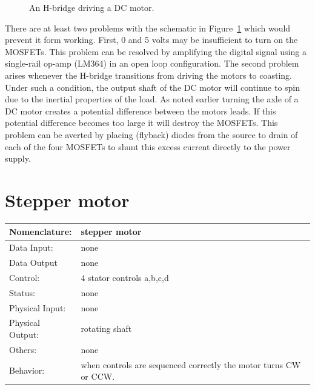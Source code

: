 \begin{figure}[ht]
\caption{An H-bridge driving a DC motor.}
\label{fig:hbridge}
\end{figure}

There are at least two problems with the schematic in
Figure~\ref{fig:hbridge} which would prevent it form working.
First, 0 and 5 volts may be insufficient to turn on the MOSFETs.
This problem can be resolved by amplifying the digital signal
using a single-rail op-amp (LM364) in an open loop configuration.
The second problem arises whenever the H-bridge transitions
from driving the motors to coasting.  Under such a condition, the
output shaft of the DC motor will continue to spin due to the
inertial properties of the load.  As noted earlier turning the
axle of a DC motor creates a potential difference between the 
motors leads.  If this potential difference becomes too
large it will destroy the MOSFETs.
This problem can be averted by placing (flyback) diodes from the 
source to drain of each of the four MOSFETs to shunt this excess 
current directly to the power supply.

\section{Stepper motor}
\label{page:stepper}
\begin{tabular}{|l|p{3.5in}|} \hline
Nomenclature:  & stepper motor \\ \hline
Data Input:    & none     \\ \hline
Data Output    & none    \\ \hline
Control:       & 4 stator controls a,b,c,d  \\ \hline
Status:        & none                                   \\ \hline
Physical Input:& none		\\ \hline
Physical Output:& rotating shaft \\ \hline
Others:        & none                   \\ \hline
Behavior:      & when controls are sequenced correctly the
motor turns CW or CCW. \\ \hline
\end{tabular}

